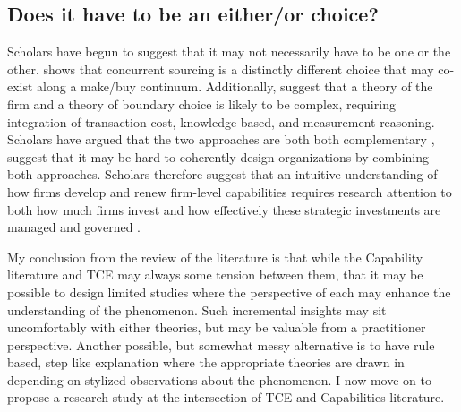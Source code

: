 \documentclass[12pt,letterpaper]{article}
\begin{document}
\subsection{Does it have to be an either/or choice?}
Scholars have begun to suggest that it may not necessarily have to be one or the other. \cite{Parmigiani2007} shows that concurrent sourcing is a distinctly different choice that may co-exist along a make/buy continuum. Additionally, \cite{Poppo1998}  suggest that a theory of the firm and a theory of boundary choice is likely to be complex, requiring integration of transaction cost, knowledge-based, and measurement reasoning. Scholars have argued that the two approaches are both both complementary \citep{Jacobides2005a, Poppo1998}, \cite{Nickerson2012} suggest that it may be hard to coherently design organizations by combining both approaches. Scholars therefore suggest that an intuitive understanding of how firms develop and renew firm-level capabilities requires research attention to both how much firms invest and how effectively these strategic investments are managed and governed \citep{Argyres1996, Kor2005, Mayer2006}.

My conclusion from the review of the literature is that while the Capability literature and TCE may always some tension between them, that it may be possible to design limited studies where the perspective of each may enhance the understanding of the phenomenon. Such incremental insights may sit uncomfortably with either theories, but may be valuable from a practitioner perspective. Another possible, but somewhat messy alternative is to have rule based, step like explanation where the appropriate theories are drawn in depending on stylized observations about the phenomenon. I now move on to propose a research study at the intersection of TCE and Capabilities literature.
\end{document}
